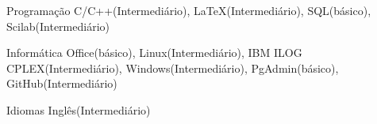

\begin{cvskills}

  \cvskill
    {Programação} %
    {C/C++(Intermediário), LaTeX(Intermediário), SQL(básico), Scilab(Intermediário)} %


  \cvskill
    {Informática} %
    {Office(básico), Linux(Intermediário), IBM ILOG CPLEX(Intermediário), Windows(Intermediário), PgAdmin(básico), GitHub(Intermediário)} %


  \cvskill
    {Idiomas} %
    {Inglês(Intermediário)} %

\end{cvskills}
